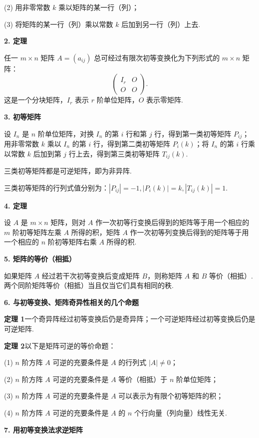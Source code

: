 \documentclass[UTF8, 12pt, fontset=fandol, oneside]{ctexart}
\begin{document}
(2) 用非零常数 $k$ 乘以矩阵的某一行（列）；

(3) 将矩阵的某一行（列）乘以常数 $k$ 后加到另一行（列）上去.

\noindent\textbf{2. 定理}

任一 $m\times n$ 矩阵 $A=(a_{ij})$ 总可经过有限次初等变换化为下列形式的 $m\times n$ 矩阵：
\[
\left(
\begin{array}{cc}
I_r & O\\
O & O
\end{array}
\right).
\]
这是一个分块矩阵，$I_r$ 表示 $r$ 阶单位矩阵，$O$ 表示零矩阵.

\noindent\textbf{3. 初等矩阵}

设 $I_n$ 是 $n$ 阶单位矩阵，对换 $I_n$ 的第 $i$ 行和第 $j$ 行，得到第一类初等矩阵 $P_{ij}$；用非零常数 $k$ 乘以 $I_n$ 的第 $i$ 行，得到第二类初等矩阵 $P_i(k)$；将 $I_n$ 的第 $i$ 行乘以常数 $k$ 后加到第 $j$ 行上去，得到第三类初等矩阵 $T_{ij}(k)$.

三类初等矩阵都是可逆矩阵，即为非异阵.

三类初等矩阵的行列式值分别为：$|P_{ij}|=-1, |P_i(k)|=k, |T_{ij}(k)|=1$.

\noindent\textbf{4. 定理}

设 $A$ 是 $m\times n$ 矩阵，则对 $A$ 作一次初等行变换后得到的矩阵等于用一个相应的 $m$ 阶初等矩阵左乘 $A$ 所得的积，矩阵 $A$ 作一次初等列变换后得到的矩阵等于用一个相应的 $n$ 阶初等矩阵右乘 $A$ 所得的积.

\noindent\textbf{5. 矩阵的等价（相抵）}

如果矩阵 $A$ 经过若干次初等变换后变成矩阵 $B$，则称矩阵 $A$ 和 $B$ 等价（相抵）. 两个同阶矩阵等价（相抵）当且仅当它们具有相同的秩.

\noindent\textbf{6. 与初等变换、矩阵奇异性相关的几个命题}

\noindent\textbf{定理 1}\quad 一个奇异阵经过初等变换后仍是奇异阵；一个可逆矩阵经过初等变换后仍是可逆矩阵.

\noindent\textbf{定理 2}\quad 以下是矩阵可逆的等价命题：

(1) $n$ 阶方阵 $A$ 可逆的充要条件是 $A$ 的行列式 $|A|\ne0$；

(2) $n$ 阶方阵 $A$ 可逆的充要条件是 $A$ 等价（相抵）于 $n$ 阶单位矩阵；

(3) $n$ 阶方阵 $A$ 可逆的充要条件是 $A$ 可以表示为有限个初等矩阵的积；

(4) $n$ 阶方阵 $A$ 可逆的充要条件是 $A$ 的 $n$ 个行向量（列向量）线性无关.

\noindent\textbf{7. 用初等变换法求逆矩阵}
\end{document}
